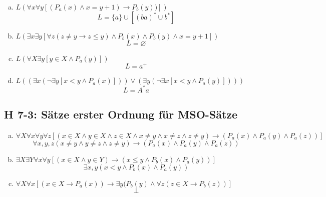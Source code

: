 \documentclass{scrartcl}
\begin{document}
\begin{enumerate}[(a)]
    \item $L\left(\forall x \forall y \left[( P_a(x) \land x = y + 1) \rightarrow P_b(y) )\right]\right)$
        $$L = \{a\} \cup \left[ (ba)^* \cup b^* \right] $$
    \item $L\left(\exists x \exists y \left[ \forall z ( z \neq y \rightarrow z \leq y) \land P_b(x) \land P_b(y) \land x = y+1 \right]\right)$
        $$ L = \varnothing $$
    \item $L\left(\forall X \exists y \left[ y \in X \land P_a(y) \right]\right)$
        $$ L = a^+ $$
    \item $L\left(\left( \exists x (\lnot\exists y \left[ x<y \land P_a(x)\right]) \right) \lor \left( \exists y (\lnot\exists x \left[ x<y \land P_a(y)\right]) \right) \right)$
        $$ L = A^*a $$
\end{enumerate}

\subsection{H 7-3: Sätze erster Ordnung für MSO-Sätze}

\begin{enumerate}[(a)]
    \item $\forall X \forall x \forall y \forall z \left[ (x \in X \land y \in X \land z \in X \land x \neq y \land x \neq z \land z \neq y) \rightarrow \left( P_a(x) \land P_a(y) \land P_a(z)\right) \right]$
        $$ \forall x,y,z (x\neq y \land y \neq z \land z \neq y) \rightarrow ( P_a(x) \land P_a(y) \land P_a(z)) $$
    \item $\exists X \exists Y \forall x \forall y \left[ \left( x \in X \land y \in Y \right) \rightarrow \left( x \leq y \land P_b(x) \land P_a(y) \right)\right]$
        $$ \exists x,y ( x < y \land P_b(x) \land P_a(y) )$$
    \item $\forall X \forall x \left[ (x \in X \rightarrow P_a(x)) \rightarrow \exists y (P_b(y) \land \forall z \left(z \in X \rightarrow P_b(z)\right)\right]$
        $$\bot$$
\end{enumerate}
\end{document}

